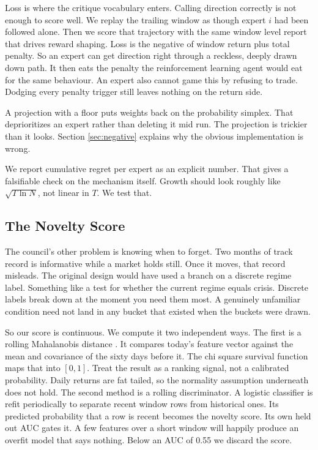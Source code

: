 \documentclass[conference]{IEEEtran}
\begin{document}
Loss is where the critique vocabulary enters. Calling direction correctly is not enough to score well. We replay the trailing window as though expert $i$ had been followed alone. Then we score that trajectory with the same window level report that drives reward shaping. Loss is the negative of window return plus total penalty. So an expert can get direction right through a reckless, deeply drawn down path. It then eats the penalty the reinforcement learning agent would eat for the same behaviour. An expert also cannot game this by refusing to trade. Dodging every penalty trigger still leaves nothing on the return side.

A projection with a floor puts weights back on the probability simplex. That deprioritizes an expert rather than deleting it mid run. The projection is trickier than it looks. Section \ref{sec:negative} explains why the obvious implementation is wrong.

We report cumulative regret per expert as an explicit number. That gives a falsifiable check on the mechanism itself. Growth should look roughly like $\sqrt{T \ln N}$, not linear in $T$. We test that.

\subsection{The Novelty Score}

The council's other problem is knowing when to forget. Two months of track record is informative while a market holds still. Once it moves, that record misleads. The original design would have used a branch on a discrete regime label. Something like a test for whether the current regime equals crisis. Discrete labels break down at the moment you need them most. A genuinely unfamiliar condition need not land in any bucket that existed when the buckets were drawn.

So our score is continuous. We compute it two independent ways. The first is a rolling Mahalanobis distance \cite{mahalanobis1936generalized}. It compares today's feature vector against the mean and covariance of the sixty days before it. The chi square survival function maps that into $[0,1]$. Treat the result as a ranking signal, not a calibrated probability. Daily returns are fat tailed, so the normality assumption underneath does not hold. The second method is a rolling discriminator. A logistic classifier is refit periodically to separate recent window rows from historical ones. Its predicted probability that a row is recent becomes the novelty score. Its own held out AUC gates it. A few features over a short window will happily produce an overfit model that says nothing. Below an AUC of 0.55 we discard the score.
\end{document}
